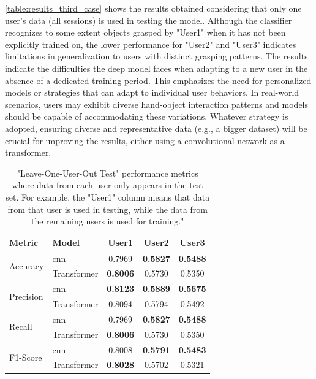 \autoref{table:results_third_case} shows the results obtained considering that only one user's data (all sessions) is used in testing the model. Although the classifier recognizes to some extent objects grasped by "User1" when it has not been explicitly trained on, the lower performance for "User2" and "User3" indicates limitations in generalization to users with distinct grasping patterns. The results indicate the difficulties the deep model faces when adapting to a new user in the absence of a dedicated training period. This emphasizes the need for personalized models or strategies that can adapt to individual user behaviors. In real-world scenarios, users may exhibit diverse hand-object interaction patterns and models should be capable of accommodating these variations. Whatever strategy is adopted, ensuring diverse and representative data (e.g., a bigger dataset) will be crucial for improving the results, either using a convolutional network as a transformer. 

\begin{table}[ht]
    \captionsetup{width=0.6\textwidth}
    \centering
    \caption{"Leave-One-User-Out Test" performance metrics where data from each user only appears in the test set. For example, the "User1" column means that data from that user is used in testing, while the data from the remaining users is used for training."}
    \label{table:results_third_case}
    \begin{tabular}{l|lccc}
        \toprule
        Metric & Model & User1 & User2 & User3 \\
        \midrule
        \multirow{2}{*}{Accuracy} & \acs{cnn} & 0.7969 & \textbf{0.5827} & \textbf{0.5488} \\
        & Transformer & \textbf{0.8006} & 0.5730 & 0.5350 \\
        \midrule
        \multirow{2}{*}{Precision} & \acs{cnn} & \textbf{0.8123} & \textbf{0.5889} & \textbf{0.5675} \\
        & Transformer & 0.8094 & 0.5794 & 0.5492 \\
        \midrule
        \multirow{2}{*}{Recall} & \acs{cnn} & 0.7969 & \textbf{0.5827} & \textbf{0.5488} \\
        & Transformer & \textbf{0.8006} & 0.5730 & 0.5350 \\
        \midrule
        \multirow{2}{*}{F1-Score} & \acs{cnn} & 0.8008 & \textbf{0.5791} & \textbf{0.5483} \\
        & Transformer & \textbf{0.8028} & 0.5702 & 0.5321 \\
        \bottomrule
    \end{tabular}
\end{table}


